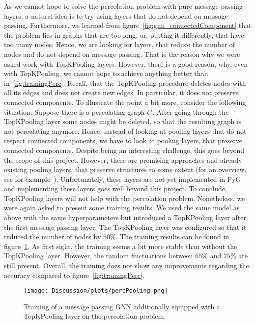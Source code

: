 As we cannot hope to solve the percolation problem with pure message passing layers, 
a natural idea is to try using layers that do not depend on message passing. 
Furthermore, we learned from figure~\ref{fig:gnn_connectedComponent} that the problem lies 
in graphs that are \glqq{}too long\grqq{}, or, putting it differently, that have too many nodes.
Hence, we are looking for layers, that reduce the number of nodes and do not depend on message passing.
That is the reason why we were asked work with TopKPooling layers.
However, there is a good reason, why, even with TopKPooling, we cannot hope to achieve 
anything better than in~\ref{fig:trainingPerc}.
Recall, that the TopKPooling procedure deletes nodes with all its edges and does not create new edges. 
In particular, it does not preserve connected components. To illustrate the point a bit more, 
consider the following situation: Suppose there is a percolating graph $G$. 
After going through the TopKPooling layer some nodes might be deleted, 
so that the resulting graph is not percolating anymore. 
Hence, instead of looking at pooling layers that do not respect connected components, we have to look 
at pooling layers, that preserve connected components.
Despite being an interesting challenge, this goes beyond the scope of this project.
However, there are promising approaches and already existing pooling layers, that preserve structures to some extent (for an overview, see for example~\cite{poolingInGNNs}).
Unfortunately, these layers are not yet implemented in PyG and implementing these layers goes well beyond this project.
To conclude, TopKPooling layers will not help with the percolation problem. 
Nonetheless, we were again asked to present some training results. We used the same model as above 
with the same hyperparameters but introduced a TopKPooling layer after the first message passing layer.
The TopKPooling layer was configured so that it reduced the number of nodes by $50\%$.  
The training results can be found in figure~\ref{fig:resTopK}.
As first sight, the training seems a bit more stable than without the TopKPooling layer. 
However, the random fluctuations between $65\%$ and $75\%$ are still present. 
Overall, the training does not show any improvements regarding the accuracy compared to figure~\ref{fig:trainingPerc}.
\begin{figure}[h]
    \centering
    \texttt{[image: Discussion/plots/percPooling.png]}
    \caption{Training of a message passing GNN additionally equipped with a TopKPooling layer on the percolation problem.}
    \label{fig:resTopK}
\end{figure}
 